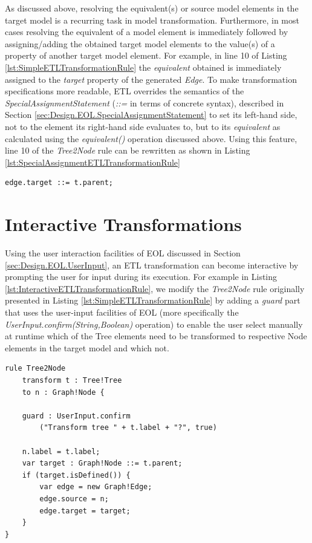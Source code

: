 As discussed above, resolving the equivalent(s) or source model elements in the target model is a recurring task in model transformation. Furthermore, in most cases resolving the equivalent of a model element is immediately followed by assigning/adding the obtained target model elements to the value(s) of a property of another target model element. For example, in line 10 of Listing \ref{lst:SimpleETLTransformationRule} the \emph{equivalent} obtained is immediately assigned to the \emph{target} property of the generated \emph{Edge}. To make transformation specifications more readable, ETL overrides the semantics of the \emph{SpecialAssignmentStatement} (\emph{::=} in terms of concrete syntax), described in Section \ref{sec:Design.EOL.SpecialAssignmentStatement} to set its left-hand side, not to the element its right-hand side evaluates to, but to its \emph{equivalent} as calculated using the \emph{equivalent()} operation discussed above. Using this feature, line 10 of the \emph{Tree2Node} rule can be rewritten as shown in Listing \ref{lst:SpecialAssignmentETLTransformationRule}

\begin{lstlisting}[caption=Rewritten Line 10 of the \emph{Tree2Node} Rule Demonstrated in Listing \ref{lst:SimpleETLTransformationRule}, label=lst:SpecialAssignmentETLTransformationRule, language=ETL]
edge.target ::= t.parent;
\end{lstlisting}


\section{Interactive Transformations}
\label{sec:InteractiveModelTransformation}

Using the user interaction facilities of EOL discussed in Section \ref{sec:Design.EOL.UserInput}, an ETL transformation can become interactive by prompting the user for input during its execution. For example in Listing \ref{lst:InteractiveETLTransformationRule}, we modify the \emph{Tree2Node} rule originally presented in Listing \ref{lst:SimpleETLTransformationRule} by adding a \emph{guard} part that uses the user-input facilities of EOL (more specifically the \emph{UserInput.confirm(String,Boolean)} operation) to enable the user select manually at runtime which of the Tree elements need to be transformed to respective Node elements in the target model and which not. 

\begin{lstlisting}[caption=Exemplar Interactive ETL Transformation, label=lst:InteractiveETLTransformationRule, language=ETL]
rule Tree2Node
	transform t : Tree!Tree
	to n : Graph!Node {
	
	guard : UserInput.confirm
		("Transform tree " + t.label + "?", true)
	
	n.label = t.label;
	var target : Graph!Node ::= t.parent;
	if (target.isDefined()) {
		var edge = new Graph!Edge;
		edge.source = n;
		edge.target = target;
	}
}
\end{lstlisting}

